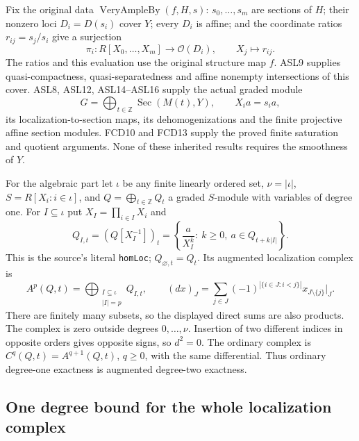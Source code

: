 \documentclass[11pt,a4paper]{article}
\numberwithin{equation}{section}
\theoremstyle{remark}\newtheorem{remark}[theorem]{Remark}
\begin{document}
Fix the original data $\operatorname{VeryAmpleBy}(f,H,s)$:
$s_0,\ldots,s_m$ are sections of $H$; their nonzero loci
$D_i=D(s_i)$ cover $Y$; every $D_i$ is affine; and the coordinate
ratios $r_{ij}=s_j/s_i$ give a surjection
\[
 \pi_i:R[X_0,\ldots,X_m]\longrightarrow\mathcal O(D_i),
 \qquad X_j\longmapsto r_{ij}.
                                                        \tag{SHV.1}
\]
The ratios and this evaluation use the original structure map $f$.
ASL9 supplies quasi-compactness, quasi-separatedness and affine nonempty
intersections of this cover.  ASL8, ASL12, ASL14--ASL16 supply the actual
graded module
\[
 G=\bigoplus_{t\in\mathbb Z}\operatorname{Sec}(M(t),Y),
 \qquad X_i a=s_i a,
                                                        \tag{SHV.2}
\]
its localization-to-section maps, its dehomogenizations and the finite
projective affine section modules.  FCD10 and FCD13 supply the proved
finite saturation and quotient arguments.  None of these inherited
results requires the smoothness of $Y$.

For the algebraic part let $\iota$ be any finite linearly ordered set,
$\nu=|\iota|$, $S=R[X_i:i\in\iota]$, and
$Q=\bigoplus_{t\in\mathbb Z}Q_t$ a graded $S$-module with variables
of degree one.  For $I\subseteq\iota$ put $X_I=\prod_{i\in I}X_i$
and
\[
 Q_{I,t}=(Q[X_I^{-1}])_t
 =\left\{\frac{a}{X_I^k}:\
       k\ge0,\ a\in Q_{t+k|I|}\right\}.
                                                        \tag{SHV.3}
\]
This is the source's literal \texttt{hom\allowbreak Loc}; $Q_{\varnothing,t}=Q_t$.
Its augmented localization complex is
\[
 A^p(Q,t)=\bigoplus_{\substack{I\subseteq\iota\\|I|=p}}Q_{I,t},
 \qquad
 (d x)_J=\sum_{j\in J}(-1)^{|\{i\in J:i<j\}|}
                   x_{J\setminus\{j\}}\big|_J .
                                                        \tag{SHV.4}
\]
There are finitely many subsets, so the displayed direct sums are also
products.  The complex is zero outside degrees $0,\ldots,\nu$.
Insertion of two different indices in opposite orders gives opposite
signs, so $d^2=0$.  The ordinary complex is
$C^q(Q,t)=A^{q+1}(Q,t)$, $q\ge0$, with the same differential.
Thus ordinary degree-one exactness is augmented degree-two exactness.

\subsection{One degree bound for the whole localization complex}

\end{document}
